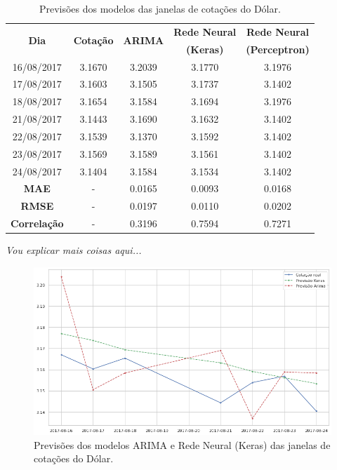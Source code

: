 \begin{table}[]
\begin{center}
\begin{tabular}{|c|c|c|c|c|}
\hline
\multirow{2}{*}{\textbf{Dia}} & \multirow{2}{*}{\textbf{Cotação}} & \multirow{2}{*}{\textbf{ARIMA}} & 
\textbf{Rede Neural} & \textbf{Rede Neural} \\
&&& \textbf{(Keras)} & \textbf{(Perceptron)} \\
\hline
\hline
16/08/2017 & 3.1670 & 3.2039 & 3.1770 & 3.1976 \\
17/08/2017 & 3.1603 & 3.1505 & 3.1737 & 3.1402 \\
18/08/2017 & 3.1654 & 3.1584 & 3.1694 & 3.1976 \\
21/08/2017 & 3.1443 & 3.1690 & 3.1632 & 3.1402 \\
22/08/2017 & 3.1539 & 3.1370 & 3.1592 & 3.1402 \\
23/08/2017 & 3.1569 & 3.1589 & 3.1561 & 3.1402 \\
24/08/2017 & 3.1404 & 3.1584 & 3.1534 & 3.1402 \\
\hline
\hline
\textbf{MAE} & - & 0.0165 & 0.0093 & 0.0168 \\
\textbf{RMSE} & - & 0.0197 & 0.0110 & 0.0202 \\
\textbf{Correlação} & - & 0.3196 & 0.7594 & 0.7271 \\
\hline
\end{tabular}
\label{tab:previsoes}
\caption[]{Previsões dos modelos das janelas de cotações do Dólar.}
\end{center}
\end{table}


\emph{Vou explicar mais coisas aqui...}

\begin{figure}[htb]
\centering
\includegraphics[width=14cm]{figuras/series_previsoes}
\caption{Previsões dos modelos ARIMA e Rede Neural (Keras) das janelas de cotações do Dólar.}
\label{fig:serie_previsoes}
\end{figure}